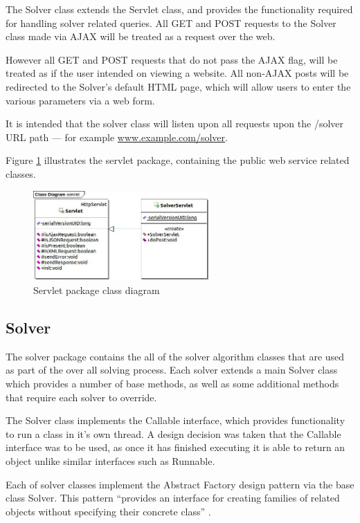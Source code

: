 The Solver class extends the Servlet class, and provides the functionality 
required for handling solver related queries. All GET and POST requests to the
Solver class made via AJAX will be treated as a request over the web. 

However all GET and POST requests that do not pass the AJAX flag, will be 
treated as if the user intended on viewing a website. All non-AJAX posts will be 
redirected to the Solver's default HTML page, which will allow users to enter 
the various parameters via a web form.

It is intended that the solver class will listen upon all requests upon the 
/solver URL path --- for example \href{}{www.example.com/solver}.

Figure \ref{fig:servlet_package} illustrates the servlet package, containing 
the public web service related classes.

\begin{figure}[H]
  \centering
  \includegraphics[width=0.6\textwidth]{class/servlet.jpg}
  \caption{Servlet package class diagram}
  \label{fig:servlet_package}
\end{figure}


\subsection{Solver}
\label{sub:solver}

The solver package contains the all of the solver algorithm classes that are 
used as part of the over all solving process. Each solver extends a main Solver
class which provides a number of base methods, as well as some additional 
methods that require each solver to override.

The Solver class implements the Callable interface, which provides functionality
to run a class in it's own thread. A design decision was taken that the Callable
interface was to be used, as once it has finished executing it is able to return
an object unlike similar interfaces such as Runnable.

Each of solver classes implement the Abstract Factory design pattern via the 
base class Solver. This pattern ``provides an interface for creating families of
related objects without specifying their concrete class'' \citep{gof}.

